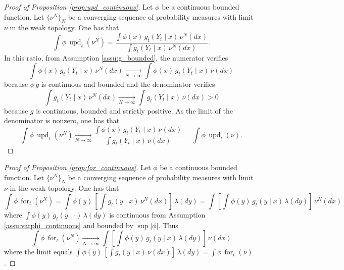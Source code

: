 \documentclass{article}
\newcommand{\limN}{\underset{N \rightarrow \infty}{\longrightarrow}}
\DeclareMathOperator{\upd}{upd}
\DeclareMathOperator{\for}{for}
\begin{document}
\begin{proof}[Proof of Proposition \ref{prop:upd_continuous}]
    Let $\phi$ be a continuous bounded function. Let $\{\nu^N\}_N$ be a converging sequence of probability measures with limit $\nu$ in the weak topology. One has that
    \begin{equation*}
       \int \phi \, \upd_t(\nu^N) = \frac{\int \phi(x) \, g_t(Y_t \mid x) \, \nu^N(dx) }{\int g_t(Y_t \mid x) \, \nu^N(dx)}. 
    \end{equation*}
    In this ratio, from Assumption \ref{assu:g_bounded}, the numerator verifies
    \begin{equation*}
        \int \phi(x) \, g_t(Y_t \mid x) \, \nu^N(dx) \limN \int \phi(x) \, g_t(Y_t \mid x) \, \nu(dx)    
    \end{equation*}
    because $\phi \, g$ is continuous and bounded and the denominator verifies
    \begin{equation*}
        \int g_t(Y_t \mid x) \, \nu^N(dx) \limN \int g_t(Y_t \mid x) \, \nu(dx) > 0  
    \end{equation*}
    because $g$ is continuous, bounded and strictly positive. As the limit of the denominator is nonzero, one has that
    \begin{equation*}
        \int \phi \, \upd_t(\nu^N) \limN \frac{\int \phi(x) \, g_t(Y_t \mid x) \, \nu(dx) }{\int g_t(Y_t \mid x) \, \nu(dx)} = \int \phi \, \upd_t(\nu).    
    \end{equation*}
\end{proof}

\begin{proof}[Proof of Proposition \ref{prop:for_continuous}]
    Let $\phi$ be a continuous bounded function. Let $\{\nu^N\}_N$ be a converging sequence of probability measures with limit $\nu$ in the weak topology. One has that
    \begin{equation*}
        \int \phi \, \for_t(\nu^N) = \int \phi(y) \, [\int g_t(y \mid x) \, \nu^N(dx)] \, \lambda(dy) = \int [\int \phi(y) \, g_t(y \mid x)\, \lambda(dy)] \, \nu^N(dx)
    \end{equation*}
    where $\displaystyle \int \phi(y) \, g_t(y \mid \cdot)\, \lambda(dy)$ is continuous from Assumption \ref{assu:varphi_continuous} and bounded by $\sup|\phi|$. Thus
    \begin{equation*}
        \int \phi \, \for_t(\nu^N) \limN \int [\int \phi(y) \, g_t(y \mid x)\, \lambda(dy)] \, \nu(dx)
    \end{equation*}
    where the limit equals $\displaystyle \int \phi(y) \, [\int g_t(y \mid x) \, \nu(dx)] \, \lambda(dy) = \int \phi \, \for_t(\nu)$.
\end{proof}
\end{document}
